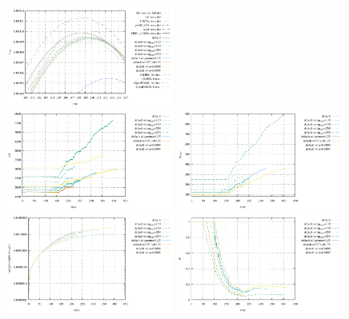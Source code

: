 \begin{center}
\includegraphics[width=5.5cm]{python_codes/fieldstone_95/results/vrms_peak1}\\
\includegraphics[width=5.5cm]{python_codes/fieldstone_95/results/nel}
\includegraphics[width=5.5cm]{python_codes/fieldstone_95/results/np_surf}\\
\includegraphics[width=5.5cm]{python_codes/fieldstone_95/results/vol2}
\includegraphics[width=5.5cm]{python_codes/fieldstone_95/results/dt}
\end{center}


